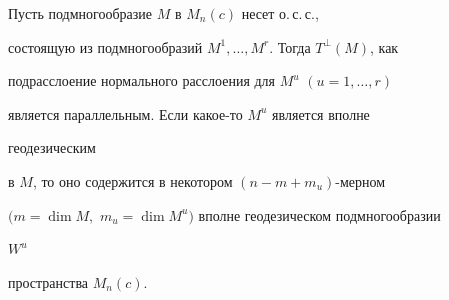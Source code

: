 




\begin{lem} Пусть подмногообразие $M$ в $M_n(c)$ несет о.\,с.\,с.,


состоящую из подмногообразий $M^1,\dotsc,M^r$. Тогда $T^\bot(M)$, как


подрасслоение нормального расслоения для $M^u$ $(u=1,\dotsc,r)$


является параллельным. Если какое-то $M^u$ является вполне


геодезическим


в $M$, то оно содержится в некотором $(n-m+m_u)$-мерном


$(m=\dim M,$ $m_u=\dim M^u)$ вполне геодезическом подмногообразии


$W^u$


пространства $M_n(c)$.


\end{lem}





